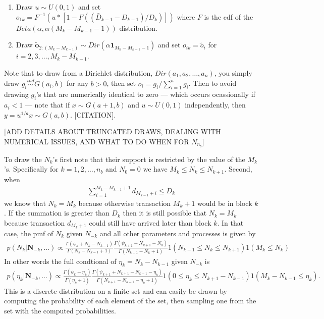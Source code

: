\documentclass{article}
\begin{document}
\begin{enumerate}
\item Draw $u \sim U(0,1)$ and set $o_{1k} = F^{-1}(u*[1 - F((\bar{D}_{k-1} - D_{k-1})/D_k)])$ where $F$ is the cdf of the $Beta(\alpha, \alpha(M_k - M_{k-1} - 1))$ distribution.
\item Draw $\tilde{\bm{o}}_{2:(M_k - M_{k-1})}\sim Dir(\alpha\bm{1}_{M_k - M_{k-1} - 1})$ and set $o_{ik} = \tilde{o}_i$ for $i = 2,3,\dots,M_k - M_{k-1}$.
\end{enumerate}

Note that to draw from a Dirichlet distribution, $Dir(a_1, a_2, \dots, a_n)$, you simply draw $g_i\stackrel{ind}{\sim} G(a_i,b)$ for any $b>0$, then set $o_i = g_i/\sum_{i=1}^ng_i$. Then to avoid drawing $g_i$'s that are numerically identical to zero --- which occurs ocassionally if $a_i < 1$ --- note that if $x\sim G(a+1,b)$ and $u\sim U(0,1)$ independently, then $y = u^{1/a}x \sim G(a,b)$. [CITATION].

[ADD DETAILS ABOUT TRUNCATED DRAWS, DEALING WITH NUMERICAL ISSUES, AND WHAT TO DO WHEN FOR $N_{n_b}$]

To draw the $N_k$'s first note that their support is restricted by the value of the $M_k$'s. Specifically for $k=1,2,\dots,n_b$ and $N_0 = 0$ we have $M_k \le N_k \le N_{k+1}$. Second, when 
\begin{align*}
\sum_{i=1}^{M_k - M_{k-1} + 1}d_{M_{k-1} + i} \le \bar{D}_k
\end{align*}
we know that $N_k = M_k$ because otherwise transaction $M_k + 1$ would be in block $k$. If the summation is greater than $D_k$ then it is still possible that $N_k = M_k$ because transaction $d_{M_k + 1}$ could still have arrived later than block $k$. In that case, the pmf of $N_k$ given $N_{-k}$ and all other parameters and processes is given by
\begin{align*}
p(N_k|\bm{N}_{-k}, \dots) \propto \frac{\Gamma(\psi_k + N_k - N_{k-1})}{\Gamma(N_k - N_{k-1} + 1)} \frac{\Gamma(\psi_{k+1} + N_{k+1} - N_{k})}{\Gamma(N_{k+1} - N_{k} + 1)}1(N_{k-1}\le N_k \le N_{k+1})1(M_k\le N_k)
\end{align*}
In other words the full condtional of $\eta_k = N_k - N_{k-1}$ given $N_{-k}$ is
\begin{align*}
p(\eta_k|\bm{N}_{-k}, \dots) \propto \frac{\Gamma(\psi_k + \eta_k)}{\Gamma(\eta_k + 1)} \frac{\Gamma(\psi_{k+1} + N_{k+1} - N_{k-1} -\eta_k)}{\Gamma(N_{k+1} - N_{k-1} - \eta_k + 1)}1(0\le \eta_k \le N_{k+1} - N_{k-1})1(M_k - N_{k-1}\le \eta_k).
\end{align*}
This is a discrete distribution on a finite set and can easily be drawn by computing the probability of each element of the set, then sampling one from the set with the computed probabilities.
\end{document}
